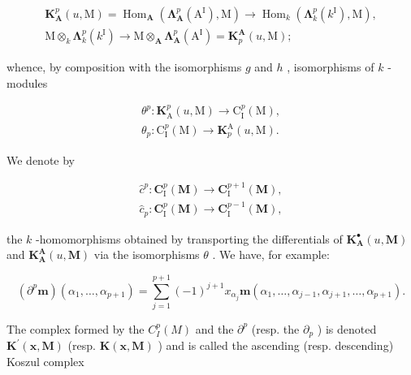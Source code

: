 \[
\begin{array}{c} \mathbf {K} _ {\mathbf {A}} ^ {p} (u, \mathrm{M}) = \operatorname{Hom} _ {\mathbf {A}} \left(\boldsymbol {\Lambda} _ {\mathbf {A}} ^ {p} (\mathrm{A} ^ {\mathrm{I}}), \mathrm{M}\right) \to \operatorname{Hom} _ {k} \left(\boldsymbol {\Lambda} _ {k} ^ {p} (k ^ {\mathrm{I}}), \mathrm{M}\right), \\ \mathrm{M} \otimes_ {k} \boldsymbol {\Lambda} _ {k} ^ {p} (k ^ {\mathrm{I}}) \to \mathrm{M} \otimes_ {\mathbf {A}} \boldsymbol {\Lambda} _ {\mathbf {A}} ^ {p} (\mathrm{A} ^ {\mathrm{I}}) = \mathbf {K} _ {p} ^ {\mathbf {A}} (u, \mathrm{M}); \end{array}
\]

whence, by composition with the isomorphisms \(g\) and \(h\) , isomorphisms of \(k\) -modules

\[
\begin{array}{l} \theta^ {p}: \mathbf {K} _ {\mathrm{A}} ^ {p} (u, \mathrm{M}) \to \mathrm{C} _ {\mathrm{I}} ^ {p} (\mathrm{M}), \\ \theta_ {p}: \mathrm{C} _ {\mathrm{I}} ^ {p} (\mathrm{M}) \to \mathbf {K} _ {p} ^ {\mathrm{A}} (u, \mathrm{M}). \end{array}
\]

We denote by

\[
\begin{array}{l} \hat {c} ^ {p}: \mathbf {C} _ {\mathrm{I}} ^ {p} (\mathbf {M}) \to \mathbf {C} _ {\mathrm{I}} ^ {p + 1} (\mathbf {M}), \\ \hat {c} _ {p}: \mathbf {C} _ {\mathrm{I}} ^ {p} (\mathbf {M}) \to \mathbf {C} _ {\mathrm{I}} ^ {p - 1} (\mathbf {M}), \end{array}
\]

the \(k\) -homomorphisms obtained by transporting the differentials of \(\mathbf{K}_{\mathbf{A}}^{\bullet}(u, \mathbf{M})\) and \(\mathbf{K}_{\mathbf{A}}^{\mathbf{A}}(u, \mathbf{M})\) via the isomorphisms \(\theta\) . We have, for example:

\[
\left(\partial^ {p} \boldsymbol {m}\right) \left(\alpha_ {1}, \dots , \alpha_ {p + 1}\right) = \sum_ {j = 1} ^ {p + 1} (- 1) ^ {j + 1} x _ {\alpha_ {j}} \boldsymbol {m} \left(\alpha_ {1}, \dots , \alpha_ {j - 1}, \alpha_ {j + 1}, \dots , \alpha_ {p + 1}\right).\tag{12}
\]

The complex formed by the \(C_{I}^{p}(M)\) and the \(\partial^{p}\) (resp. the \(\partial_{p}\) ) is denoted \(\mathbf{K}^{\prime}(\mathbf{x},\mathbf{M})\) (resp. \(\mathbf{K}(\mathbf{x},\mathbf{M})\) ) and is called the ascending (resp. descending) Koszul complex

